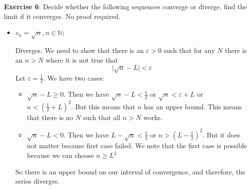 \documentclass{article}
\begin{document}
\textbf{Exercise 6}: Decide whether the following sequences converge or diverge, find the limit if it converges. No proof required.
    \begin{itemize}
        \item $s_{n} = \sqrt{n}, n \in \mathbb{N}$;
            \begin{answer}
                Diverges. We need to show that there is an $\varepsilon > 0$ such that for any $N$ there is an $n > N$ where it is not true that
                    \begin{equation*}
                        \lvert \sqrt{n} - L \rvert < \varepsilon
                    \end{equation*}
                Let $\varepsilon = \frac{1}{2}$. We have two cases:
                    \begin{itemize}
                        \item $\sqrt{n} - L \geq 0$. Then we have $\sqrt{n} - L < \frac{1}{2}$ or $\sqrt{n} < \varepsilon + L$ or $n < (\frac{1}{2} + L)^{2}$. But this means that $n$ has an upper bound. This means that there is no $N$ such that all $n > N$ works.

                        \item $\sqrt{n} - L < 0$. Then we have $L - \sqrt{n} < \frac{1}{2}$ or $n > (L - \frac{1}{2})^{2}$. But it does not matter because first case failed. We note that the first case is possible because we can choose $n \geq L^{2}$
                    \end{itemize}
                So there is an upper bound on our interval of convergence, and therefore, the series diverges.
            \end{answer}


\end{itemize}
\end{document}
